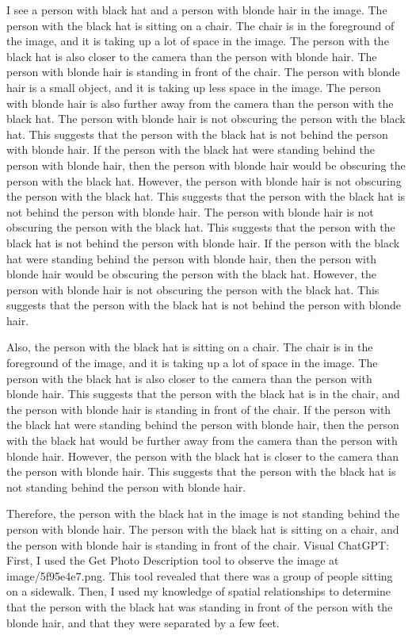 \begin{enumerate}
    I see a person with black hat and a person with blonde hair in the image.
    The person with the black hat is sitting on a chair. The chair is in the foreground of the image, and it is taking up a lot of space in the image. The person with the black hat is also closer to the camera than the person with blonde hair.
    The person with blonde hair is standing in front of the chair. The person with blonde hair is a small object, and it is taking up less space in the image. The person with blonde hair is also further away from the camera than the person with the black hat.
    The person with blonde hair is not obscuring the person with the black hat. This suggests that the person with the black hat is not behind the person with blonde hair.
    If the person with the black hat were standing behind the person with blonde hair, then the person with blonde hair would be obscuring the person with the black hat. However, the person with blonde hair is not obscuring the person with the black hat. This suggests that the person with the black hat is not behind the person with blonde hair.
    The person with blonde hair is not obscuring the person with the black hat. This suggests that the person with the black hat is not behind the person with blonde hair. If the person with the black hat were standing behind the person with blonde hair, then the person with blonde hair would be obscuring the person with the black hat. However, the person with blonde hair is not obscuring the person with the black hat. This suggests that the person with the black hat is not behind the person with blonde hair.
    
    Also, the person with the black hat is sitting on a chair. The chair is in the foreground of the image, and it is taking up a lot of space in the image. The person with the black hat is also closer to the camera than the person with blonde hair. This suggests that the person with the black hat is in the chair, and the person with blonde hair is standing in front of the chair. If the person with the black hat were standing behind the person with blonde hair, then the person with the black hat would be further away from the camera than the person with blonde hair. However, the person with the black hat is closer to the camera than the person with blonde hair. This suggests that the person with the black hat is not standing behind the person with blonde hair.
    
    Therefore, the person with the black hat in the image is not standing behind the person with blonde hair. The person with the black hat is sitting on a chair, and the person with blonde hair is standing in front of the chair.
    \subitem Visual ChatGPT: 
    First, I used the Get Photo Description tool to observe the image at image/5f95e4e7.png. This tool revealed that there was a group of people sitting on a sidewalk. Then, I used my knowledge of spatial relationships to determine that the person with the black hat was standing in front of the person with the blonde hair, and that they were separated by a few feet.
\end{enumerate}
